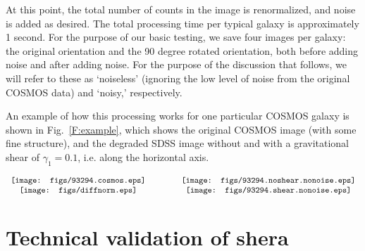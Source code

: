 \documentclass[twocolumn,useAMS,usenatbib]{mn2e}
\newcommand{\newtext}{}
\begin{document}
At this point, the total number of counts in the image  is
renormalized, and noise is added as desired.  The total processing
time per typical galaxy is approximately 1 second.  For the purpose
of our basic testing, we save four images per galaxy: the original
orientation and the 90 degree rotated orientation, both before adding
noise and after adding noise.  For the purpose of the discussion that
follows, we will refer to these as `noiseless' (ignoring the low
level of noise from the original COSMOS data) and `noisy,' respectively.

\newtext{An example of how this processing works for one particular COSMOS
galaxy is shown in Fig.~\ref{F:example}, which shows the original
COSMOS image (with some fine
structure), and the degraded SDSS image without and with a
gravitational shear of $\gamma_1=0.1$, i.e. along the horizontal
axis.}
\begin{figure*}
\begin{center}
\hspace{-0.5in}
$\begin{array}{c@{\hspace{0.6in}}c}
\texttt{[image: figs/93294.cosmos.eps]} &
\texttt{[image: figs/93294.noshear.nonoise.eps]}\\
\texttt{[image: figs/diffnorm.eps]} &
\texttt{[image: figs/93294.shear.nonoise.eps]} \\
\end{array}$
\caption{\label{F:example}\newtext{Example of how the {\sc shera}
    processing changes the galaxy images.  {\em Top left:} The original
    galaxy image in COSMOS, on a linear scale.  {\em Top right:} The
  appearance of the galaxy in SDSS after PSF-matching, before adding
  levels of sky noise consistent with SDSS.  {\em Bottom right:} Same
  as bottom left, but with a significant shear in the horizontal direction,
  $\gamma_1=0.1$.  {\em Bottom left:} Difference image between the
  sheared and unsheared simulated image, normalized by the unsheared
  image.  Because the differences are at most a few tens of per cent,
  they are difficult to pick out visually by comparing the top and
  bottom right images.}
}
\end{center}
\end{figure*}

\section{Technical validation of {\sc shera}}\label{S:techvalidation}
\end{document}
